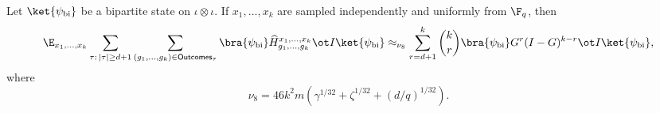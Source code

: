 \begin{lemma}\label{lem:from-H-to-G}
	\leanok
	Let $\ket{\psi_{\mathrm{bi}}}$ be a bipartite state on $\iota \otimes \iota$.  If
	$x_1,\dots,x_k$ are sampled independently and uniformly from $\F_q$, then
	\[
		\E_{x_1,\dots,x_k} \sum_{\tau:\,|\tau|\ge d+1} \sum_{(g_1,\dots,g_k)\in \mathsf{Outcomes}_\tau}
		\bra{\psi_{\mathrm{bi}}} \widehat H_{g_1,\dots,g_k}^{x_1,\dots,x_k} \ot I \ket{\psi_{\mathrm{bi}}}
		\approx_{\nu_8}
		\sum_{r=d+1}^k \binom{k}{r} \bra{\psi_{\mathrm{bi}}} G^r(I-G)^{k-r} \ot I
		\ket{\psi_{\mathrm{bi}}},
	\]
	where
	\[
		\nu_8 = 46k^2m\left(\gamma^{1/32}+\zeta^{1/32}+(d/q)^{1/32}\right).
	\]
\end{lemma}
